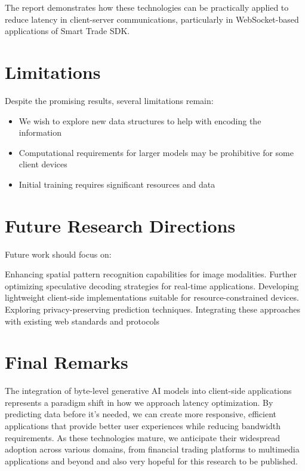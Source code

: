 \documentclass[a4paper, 11pt, twoside, openright]{report}
\begin{document}
The report demonstrates how these technologies can be practically applied to reduce latency in client-server communications, particularly in WebSocket-based applications of Smart Trade SDK.

\section{Limitations}
Despite the promising results, several limitations remain:

\begin{itemize}
    \item We wish to explore new data structures to help with encoding the information
    \item Computational requirements for larger models may be prohibitive for some client devices
    \item Initial training requires significant resources and data
\end{itemize}

\section{Future Research Directions}
Future work should focus on:

Enhancing spatial pattern recognition capabilities for image modalities. Further optimizing speculative decoding strategies for real-time applications. 
Developing lightweight client-side implementations suitable for resource-constrained devices.
 Exploring privacy-preserving prediction techniques.
Integrating these approaches with existing web standards and protocols


\section{Final Remarks}
The integration of byte-level generative AI models into client-side applications represents a paradigm shift in how we approach latency optimization. By predicting data before it's needed, we can create more responsive, efficient applications that provide better user experiences while reducing bandwidth requirements. As these technologies mature, we anticipate their widespread adoption across various domains, from financial trading platforms to multimedia applications and beyond and also very hopeful for this research to be published.

\end{document}
